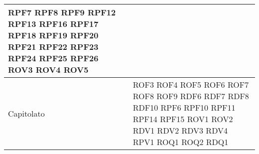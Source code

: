 \begin{longtable}{| p{5cm} | p{5cm} |}
					RPF7 \newline
					RPF8 \newline
					RPF9 \newline
					RPF12 \newline
					RPF13 \newline
					RPF16 \newline
					RPF17 \newline
					RPF18 \newline
					RPF19 \newline
					RPF20 \newline
					RPF21 \newline
					RPF22 \newline
					RPF23 \newline
					RPF24 \newline
					RPF25\newline
					RPF26 \newline
					ROV3 \newline
					ROV4 \newline
					ROV5 \newline
					 \\ \hline
					
		\rowcolor{LightGray}
		Capitolato & ROF3 \newline
					ROF4 \newline
					ROF5 \newline
					ROF6 \newline
					ROF7 \newline
					ROF8 \newline
					ROF9 \newline
					RDF6 \newline
					RDF7 \newline
					RDF8 \newline
					RDF10 \newline
					RPF6 \newline
					RPF10 \newline
					RPF11 \newline
					RPF14 \newline
					RPF15 \newline
					ROV1 \newline
					ROV2 \newline
					RDV1 \newline
					RDV2 \newline
					RDV3 \newline
					RDV4 \newline
					RPV1 \newline
					ROQ1 \newline
					ROQ2\newline
					RDQ1\newline	
		 \\
		

\end{longtable}
